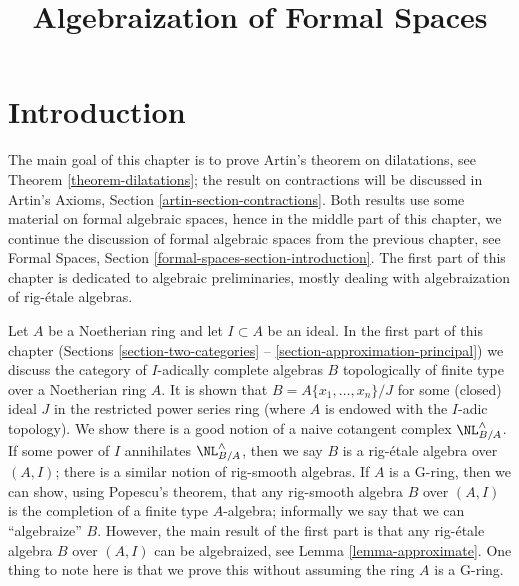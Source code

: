 

%


\title{Algebraization of Formal Spaces}


\maketitle

\label{section-phantom}

\tableofcontents

\section{Introduction}
\label{section-introduction}

\noindent
The main goal of this chapter is to prove Artin's theorem on dilatations,
see Theorem \ref{theorem-dilatations}; the result on contractions will be
discussed in Artin's Axioms, Section \ref{artin-section-contractions}.
Both results use some material on formal algebraic spaces, hence
in the middle part of this chapter, we
continue the discussion of formal algebraic spaces from the previous
chapter, see Formal Spaces, Section \ref{formal-spaces-section-introduction}.
The first part of this chapter is dedicated to algebraic preliminaries,
mostly dealing with algebraization of rig-\'etale algebras.

\medskip\noindent
Let $A$ be a Noetherian ring and let $I \subset A$ be an ideal. In the
first part of this chapter (Sections \ref{section-two-categories}
-- \ref{section-approximation-principal})
we discuss the category of $I$-adically complete algebras $B$
topologically of finite type over a Noetherian ring $A$.
It is shown that $B = A\{x_1, \ldots, x_n\}/J$ for some
(closed) ideal $J$ in the restricted power series ring
(where $A$ is endowed with the $I$-adic topology).
We show there is a good notion of a naive cotangent complex
$\NL_{B/A}^\wedge$. If some power of $I$ annihilates
$\NL_{B/A}^\wedge$, then we say $B$ is a rig-\'etale algebra
over $(A, I)$; there is a similar notion of rig-smooth algebras.
If $A$ is a G-ring, then we can show, using Popescu's theorem,
that any rig-smooth algebra $B$ over $(A, I)$ is the completion
of a finite type $A$-algebra; informally we say that we can ``algebraize'' $B$.
However, the main result of the first part is that any rig-\'etale
algebra $B$ over $(A, I)$ can be algebraized, see
Lemma \ref{lemma-approximate}.
One thing to note here is that we prove this without assuming
the ring $A$ is a G-ring.

